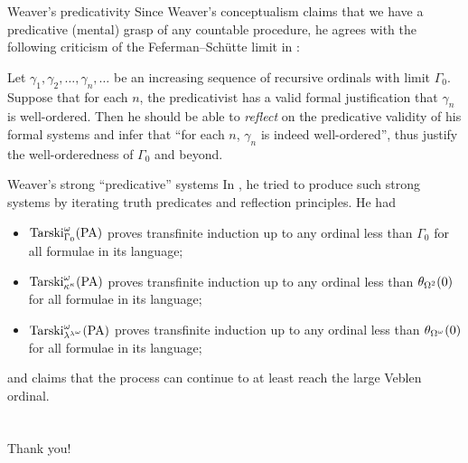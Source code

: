 \documentclass{beamer}
\makeatletter
\def\beamer@writeslidentry@miniframesoff{%
  \expandafter\beamer@ifempty\expandafter{\beamer@framestartpage}{}%
  {%
    \clearpage\beamer@notesactions%
  }
}
\newcommand*{\miniframesoff}{\let\beamer@writeslidentry=\beamer@writeslidentry@miniframesoff}
\theoremstyle{definition}
\makeatother
\begin{document}
\begin{frame}{Weaver's predicativity}
  Since Weaver's conceptualism claims that we have a predicative (mental) grasp of any countable procedure, he agrees with the following criticism of the Feferman--Sch\"utte limit in \cite{howard96-proof-theory}:

  \vspace{0.6em}

  Let $\gamma_1, \gamma_2, \ldots, \gamma_n, \ldots$ be an increasing sequence of recursive ordinals with limit $\Gamma_0$. Suppose that for each $n$, the predicativist has a valid formal justification that $\gamma_n$ is well-ordered. Then he should be able to \emph{reflect} on the predicative validity of his formal systems and infer that ``for each $n$, $\gamma_n$ is indeed well-ordered'', thus justify the well-orderedness of $\Gamma_0$ and beyond.
\end{frame}

\begin{frame}{Weaver's strong ``predicative'' systems}
  In \cites{weaver09-predicativity,weaver22-tarskian-truth-predicates}, he tried to produce such strong systems by iterating truth predicates and reflection principles. He had
  \begin{itemize}
    \item $\mathrm{Tarski}_{\Gamma_0}^\omega\mleft(\mathrm{PA}\mright)$ proves transfinite induction up to any ordinal less than $\Gamma_0$ for all formulae in its language;
    \item $\mathrm{Tarski}_{\kappa^\kappa}^\omega\mleft(\mathrm{PA}\mright)$ proves transfinite induction up to any ordinal less than $\theta_{\Omega^2}\mleft(0\mright)$ for all formulae in its language;
    \item $\mathrm{Tarski}_{\lambda^{\lambda^{\omega}}}^\omega\mleft(\mathrm{PA}\mright)$ proves transfinite induction up to any ordinal less than $\theta_{\Omega^\omega}\mleft(0\mright)$ for all formulae in its language;
  \end{itemize}
  \textellipsis and claims that the process can continue to at least reach the large Veblen ordinal.
\end{frame}

\miniframesoff

\section*{}

\begin{frame}
  \Large Thank you!
\end{frame}

\begin{frame}[allowframebreaks=0.9]
  \renewcommand{\section}[2]{}
  \bibmain
\end{frame}
\end{document}
